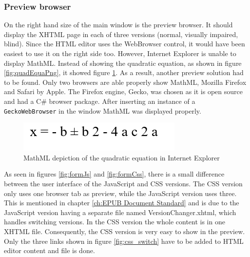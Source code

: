\subsubsection{Preview browser}

On the right hand size of the main window is the preview browser. It should display the XHTML page in each of three versions (normal, visually impaired, blind). Since the HTML editor uses the WebBrowser control, it would have been easiest to use it on the right side too. However, Internet Explorer is unable to display MathML. Instead of showing the quadratic equation, as shown in figure \ref{fig:quadEquaPng}, it showed figure \ref{fig:IEmathml}. As a result, another preview solution had to be found. Only two browsers are able properly show MathML, Mozilla Firefox and Safari by Apple. The Firefox engine, Gecko, was chosen as it is open source and had a C\# browser package. After inserting an instance of a \lstinline|GeckoWebBrowser| in the window MathML was displayed properly.

\begin{figure}
	\begin{center}
		\includegraphics[width=\linewidth/2]{figures/IEmathml.png}	
		\caption{MathML depiction of the quadratic equation in Internet Explorer}
		\label{fig:IEmathml}
	\end{center}
\end{figure}

As seen in figures \ref{fig:formJs} and \ref{fig:formCss}, there is a small difference between the user interface of the JavaScript and CSS versions. The CSS version only uses one browser tab as preview, while the JavaScript version uses three. This is mentioned in chapter \ref{ch:EPUB Document Standard} and is due to the JavaScript version having a separate file named VersionChanger.xhtml, which handles switching versions. In the CSS version the whole content is in one XHTML file. Consequently, the CSS version is very easy to show in the preview. Only the three links shown in figure \ref{fig:css_switch} have to be added to HTML editor content and file is done.

